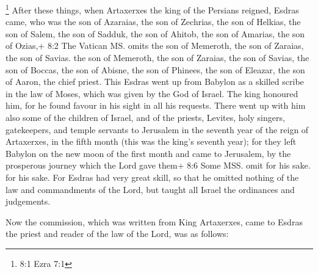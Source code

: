  \footnote{8:1 Ezra 7:1} After these things, when Artaxerxes
the king of the Persians reigned, Esdras came, who was the son of
Azaraias, the son of Zechrias, the son of Helkias, the son of Salem,
 the son of Sadduk, the son of Ahitob, the son of Amarias,
the son of Ozias,+ 8:2 The Vatican MS. omits the son of Memeroth, the
son of Zaraias, the son of Savias. the son of Memeroth, the son of
Zaraias, the son of Savias, the son of Boccas, the son of Abisne, the
son of Phinees, the son of Eleazar, the son of Aaron, the chief priest.
 This Esdras went up from Babylon as a skilled scribe in the
law of Moses, which was given by the God of Israel.  The
king honoured him, for he found favour in his sight in all his requests.
 There went up with him also some of the children of Israel,
and of the priests, Levites, holy singers, gatekeepers, and temple
servants to Jerusalem  in the seventh year of the reign of
Artaxerxes, in the fifth month (this was the king's seventh year); for
they left Babylon on the new moon of the first month and came to
Jerusalem, by the prosperous journey which the Lord gave them+ 8:6 Some
MSS. omit for his sake. for his sake.  For Esdras had very
great skill, so that he omitted nothing of the law and commandments of
the Lord, but taught all Israel the ordinances and judgements.

 Now the commission, which was written from King Artaxerxes,
came to Esdras the priest and reader of the law of the Lord, was as
follows:

